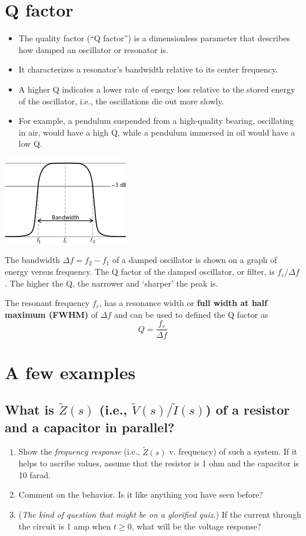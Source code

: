 \documentclass[11pt]{book}
\begin{document}
\section{Q factor}
\begin{itemize}
	\item The quality factor (``Q factor'') is a dimensionless parameter that describes how damped an oscillator or resonator is. 
	\item It characterizes a resonator's bandwidth relative to its center frequency.
	\item A higher Q indicates a lower rate of energy loss relative to the stored energy of the oscillator, i.e., the oscillations die out more slowly. 
	\item For example, a pendulum suspended from a high-quality bearing, oscillating in air, would have a high Q, while a pendulum immersed in oil would have a low Q.
\end{itemize}
\begin{center}
	\includegraphics{figures/14.02.png}
\end{center}
The bandwidth $\Delta f = f_2 - f_1$ of a damped oscillator is shown on a graph of energy versus frequency. The Q factor of the damped oscillator, or filter, is $f_c/\Delta f$. The higher the Q, the narrower and ‘sharper’ the peak is.

The resonant frequency $f_r$, has a resonance width or \textbf{full width at half maximum (FWHM)} of $\Delta f$ and can be used to defined the Q factor as 
\begin{equation}
	Q = \frac{f_r}{\Delta f}
\end{equation}




\newpage
\section{A few examples}
\subsection{What is $\tilde{Z}(s)$ (i.e., $\tilde{V}(s)/\tilde{I}(s)$) of a resistor and a capacitor in parallel?}
\begin{enumerate}
	\item Show the \textit{frequency response} (i.e., $\tilde{Z}(s)$ v. frequency) of such a system. If it helps to ascribe values, assume that the resistor is 1 ohm and the capacitor is 10 farad.
	\item Comment on the behavior. Is it like anything you have seen before?
	\item (\textit{The kind of question that might be on a glorified quiz.}) If the current through the circuit is 1 amp when $t \geq 0$, what will be the voltage response?
\end{enumerate}
\end{document}
